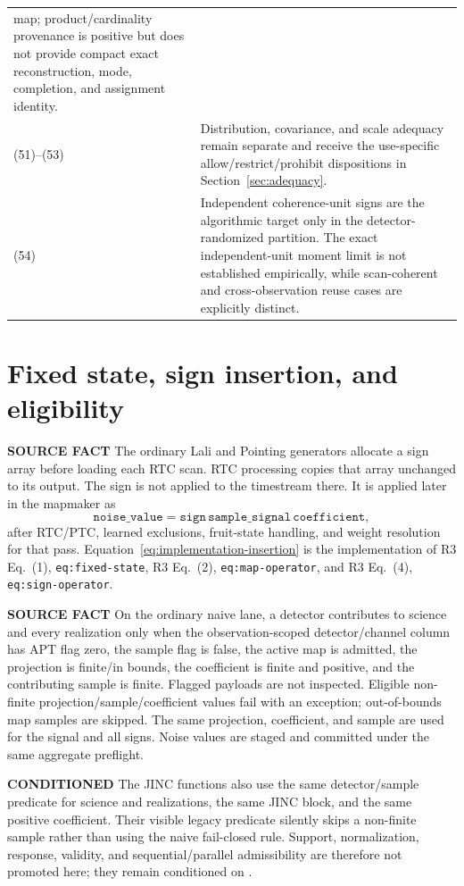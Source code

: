 \documentclass[10pt]{article}
\newcommand{\srclabel}{\textbf{SOURCE FACT}}
\newcommand{\conditionedlabel}{\textbf{CONDITIONED}}
\newcommand{\rthree}[2]{R3 Eq.~(#1), \texttt{#2}}
\begin{document}
\begin{longtable}{@{}p{}p{}@{}}
map; product/cardinality provenance is positive but does not provide compact
exact reconstruction, mode, completion, and assignment identity. \\
(51)--(53) &
Distribution, covariance, and scale adequacy remain separate and receive the
use-specific allow/restrict/prohibit dispositions in
Section~\ref{sec:adequacy}. \\
(54) &
Independent coherence-unit signs are the algorithmic target only in the
detector-randomized partition.  The exact independent-unit moment limit is not
established empirically, while scan-coherent and cross-observation reuse cases
are explicitly distinct. \\
\bottomrule
\end{longtable}

\section{Fixed state, sign insertion, and eligibility}
\label{sec:insertion}

\srclabel{} The ordinary Lali and Pointing generators allocate a sign array
before loading each RTC scan.  RTC processing copies that array unchanged to
its output.  The sign is not applied to the timestream there.  It is applied
later in the mapmaker as
\begin{equation}
  \texttt{noise\_value}=
  \texttt{sign}\,\texttt{sample\_signal}\,\texttt{coefficient},
  \label{eq:implementation-insertion}
\end{equation}
after RTC/PTC, learned exclusions, fruit-state handling, and weight
resolution for that pass.  Equation~\eqref{eq:implementation-insertion} is
the implementation of \rthree{1}{eq:fixed-state},
\rthree{2}{eq:map-operator}, and \rthree{4}{eq:sign-operator}.

\srclabel{} On the ordinary naive lane, a detector contributes to science and
every realization only when the observation-scoped detector/channel column
has APT flag zero, the sample flag is false, the active map is admitted, the
projection is finite/in bounds, the coefficient is finite and positive, and
the contributing sample is finite.  Flagged payloads are not inspected.
Eligible non-finite projection/sample/coefficient values fail with an
exception; out-of-bounds map samples are skipped.  The same projection,
coefficient, and sample are used for the signal and all signs.  Noise values
are staged and committed under the same aggregate preflight.

\conditionedlabel{} The JINC functions also use the same detector/sample
predicate for science and realizations, the same JINC block, and the same
positive coefficient.  Their visible legacy predicate silently skips a
non-finite sample rather than using the naive fail-closed rule.  Support,
normalization, response, validity, and sequential/parallel admissibility are
therefore not promoted here; they remain conditioned on .
\end{document}
